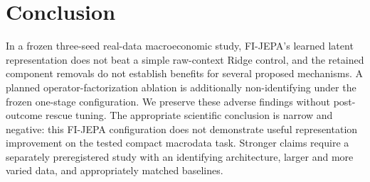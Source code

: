 \documentclass[11pt]{article}
\begin{document}
\section{Conclusion}
In a frozen three-seed real-data macroeconomic study, FI-JEPA's learned latent representation does not beat a simple raw-context Ridge control, and the retained component removals do not establish benefits for several proposed mechanisms. A planned operator-factorization ablation is additionally non-identifying under the frozen one-stage configuration. We preserve these adverse findings without post-outcome rescue tuning. The appropriate scientific conclusion is narrow and negative: this FI-JEPA configuration does not demonstrate useful representation improvement on the tested compact macrodata task. Stronger claims require a separately preregistered study with an identifying architecture, larger and more varied data, and appropriately matched baselines.
\end{document}
